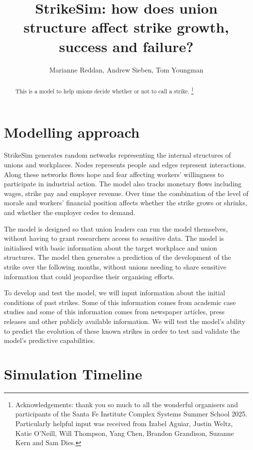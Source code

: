 \documentclass[a4paper]{article}
\title{StrikeSim: how does union structure affect strike growth, success and failure?}
\author{Marianne Reddan, Andrew Sieben, Tom Youngman}
\begin{document}
\maketitle

\begin{abstract}
This is a model to help unions decide whether or not to call a strike. \footnote{Acknowledgements: thank you so much to all the wonderful organisers and participants of the Santa Fe Institute Complex Systems Summer School 2025. Particularly helpful input was received from Izabel Aguiar, Justin Weltz, Katie O'Neill, Will Thompson, Yang Chen, Brandon Grandison, Suzanne Kern and Sam Dies.}
\end{abstract}

\section{Modelling approach}

StrikeSim  generates random networks representing the internal structures of unions and workplaces. Nodes represents people and edges represent interactions. Along these networks flows hope and fear affecting workers' willingness to participate in industrial action. The model also tracks monetary flows including wages, strike pay and employer revenue. Over time the combination of the level of morale and workers' financial position affects whether the strike grows or shrinks, and whether the employer cedes to demand.

The model is designed so that union leaders can run the model themselves, without having to grant researchers access to sensitive data. The model is initialised with basic information about the target workplace and union structures. The model then generates a prediction of the development of the strike over the following months, without unions needing to share sensitive information that could jeopardise their organising efforts.

To develop and test the model, we will input information about the initial conditions of past strikes. Some of this information comes from academic case studies and some of this information comes from newspaper articles, press releases and other publicly available information. We will test the model's ability to predict the evolution of these known strikes in order to test and validate the model's  predictive capabilities. 

\section{Simulation Timeline}
\end{document}
